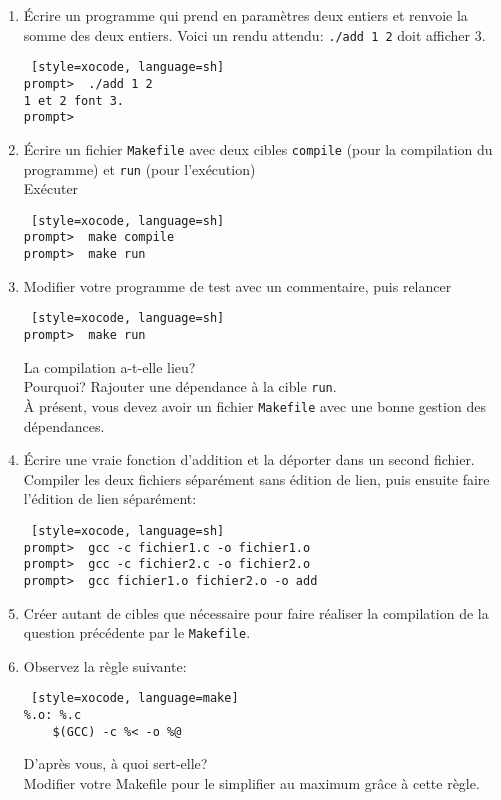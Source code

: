 \documentclass[10pt, a4paper ]{article}
\begin{document}
\begin{enumerate}
    \addtolength{\itemsep}{5mm}

    \item Écrire un programme qui prend en paramètres deux entiers et renvoie la
        somme des deux entiers. Voici un rendu attendu:
        \texttt{./add 1 2} doit afficher 3.
        \begin{lstlisting} [style=xocode, language=sh]
prompt>  ./add 1 2
1 et 2 font 3.
prompt>  
        \end{lstlisting}

    \item Écrire un fichier \texttt{Makefile} avec deux cibles \texttt{compile}
        (pour la compilation du programme) et \texttt{run} (pour
        l'exécution)\\Exécuter
        \begin{lstlisting} [style=xocode, language=sh]
prompt>  make compile
prompt>  make run
        \end{lstlisting}

    \item Modifier votre programme de test avec un commentaire, puis relancer
        \begin{lstlisting} [style=xocode, language=sh]
prompt>  make run
        \end{lstlisting}
        La compilation a-t-elle lieu?\\
        Pourquoi? Rajouter une dépendance à la cible \texttt{run}.\\[2mm]
        À présent, vous devez avoir
        un fichier \texttt{Makefile} avec une bonne gestion des dépendances.

    \item Écrire une vraie fonction d'addition et la déporter dans un second
        fichier.\\
        Compiler les deux fichiers séparément sans édition de lien, puis ensuite
        faire l'édition de lien séparément:
        \begin{lstlisting} [style=xocode, language=sh]
prompt>  gcc -c fichier1.c -o fichier1.o
prompt>  gcc -c fichier2.c -o fichier2.o
prompt>  gcc fichier1.o fichier2.o -o add
        \end{lstlisting}

    \item Créer autant de cibles que nécessaire pour faire réaliser la
        compilation de la question précédente par le \texttt{Makefile}.

    \item Observez la règle suivante:
\begin{lstlisting} [style=xocode, language=make]
%.o: %.c
    $(GCC) -c %< -o %@
\end{lstlisting}
D'après vous, à quoi sert-elle?\\
Modifier votre Makefile pour le simplifier au maximum grâce à cette règle.

\end{enumerate}
\end{document}
